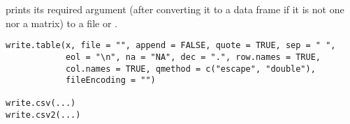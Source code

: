 %
\begin{Description}\relax
{} prints its required argument  (after
converting it to a data frame if it is not one nor a matrix) to
a file or .
\end{Description}
%
\begin{Usage}
\begin{verbatim}
write.table(x, file = "", append = FALSE, quote = TRUE, sep = " ",
            eol = "\n", na = "NA", dec = ".", row.names = TRUE,
            col.names = TRUE, qmethod = c("escape", "double"),
            fileEncoding = "")

write.csv(...)
write.csv2(...)
\end{verbatim}
\end{Usage}
%
